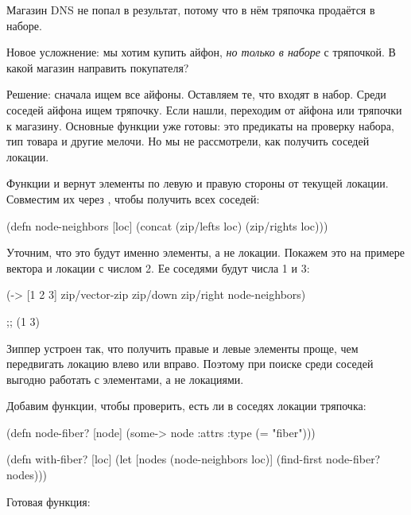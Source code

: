 Магазин DNS не попал в результат, потому что в нём тряпочка продаётся в наборе.

Новое усложнение: мы хотим купить айфон, \emph{но только в наборе} с тряпочкой. В
какой магазин направить покупателя?

Решение: сначала ищем все айфоны. Оставляем те, что входят в набор. Среди
соседей айфона ищем тряпочку. Если нашли, переходим от айфона или тряпочки к
магазину. Основные функции уже готовы: это предикаты на проверку набора, тип
товара и другие мелочи. Но мы не рассмотрели, как получить соседей локации.

Функции  и  вернут элементы по левую и правую
стороны от текущей локации. Совместим их через , чтобы получить
всех соседей:

\begin{english}
  \begin{clojure}
(defn node-neighbors [loc]
  (concat (zip/lefts loc)
          (zip/rights loc)))
  \end{clojure}
\end{english}

Уточним, что это будут именно элементы, а не локации. Покажем это на примере
вектора и локации с числом 2. Ее соседями будут числа 1 и 3:

\begin{english}
  \begin{clojure}
(-> [1 2 3]
    zip/vector-zip
    zip/down
    zip/right
    node-neighbors)

;; (1 3)
  \end{clojure}
\end{english}

Зиппер устроен так, что получить правые и левые элементы проще, чем передвигать
локацию влево или вправо. Поэтому при поиске среди соседей выгодно работать с
элементами, а не локациями.

Добавим функции, чтобы проверить, есть ли в соседях локации тряпочка:

\begin{english}
  \begin{clojure}
(defn node-fiber?
  [node]
  (some-> node :attrs :type (= "fiber")))

(defn with-fiber?
  [loc]
  (let [nodes (node-neighbors loc)]
    (find-first node-fiber? nodes)))
  \end{clojure}
\end{english}

Готовая функция:

